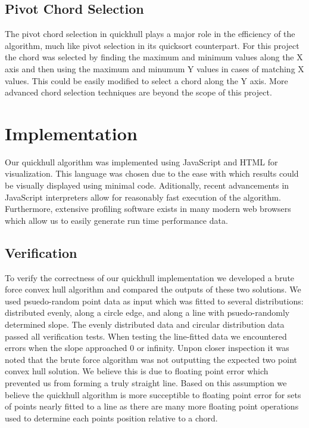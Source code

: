 \documentclass[11pt]{article}
\begin{document}
\subsection{Pivot Chord Selection}
The pivot chord selection in quickhull plays a major role in the efficiency of the algorithm, much like pivot selection in its quicksort counterpart. For this project the chord was selected by finding the maximum and minimum values along the X axis and then using the maximum and minumum Y values in cases of matching X values. This could be easily modified to select a chord along the Y axis. More advanced chord selection techniques are beyond the scope of this project.

\section{Implementation}
Our quickhull algorithm was implemented using JavaScript and HTML for visualization. This language was chosen due to the ease with which results could be visually displayed using minimal code. Aditionally, recent advancements in JavaScript interpreters allow for reasonably fast execution of the algorithm. Furthermore, extensive profiling software exists in many modern web browsers which allow us to easily generate run time performance data.

\subsection{Verification}
To verify the correctness of our quickhull implementation we developed a brute force convex hull algorithm and compared the outputs of these two solutions. We used psuedo-random point data as input which was fitted to several distributions: distributed evenly, along a circle edge, and along a line with psuedo-randomly determined slope. The evenly distributed data and circular distribution data passed all verification tests. When testing the line-fitted data we encountered errors when the slope approached 0 or infinity. Unpon closer inspection it was noted that the brute force algorithm was not outputting the expected two point convex hull solution. We believe this is due to floating point error which prevented us from forming a truly straight line. Based on this assumption we believe the quickhull algorithm is more succeptible to floating point error for sets of points nearly fitted to a line as there are many more floating point operations used to determine each points position relative to a chord.
\end{document}
